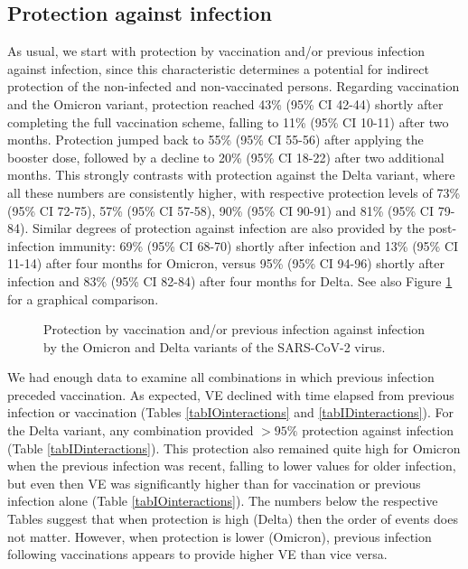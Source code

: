 \documentclass[preprint,12pt,authoryear]{elsarticle}
\begin{document}
\subsection*{Protection against infection}

As usual, we start with protection by vaccination and/or previous infection against infection, since this characteristic determines a potential for indirect protection of the non-infected and non-vaccinated persons. Regarding vaccination and the Omicron variant, protection reached 43\% (95\% CI 42-44) shortly after completing the full vaccination scheme, falling to 11\% (95\% CI 10-11) after two months. Protection jumped back to 55\% (95\% CI 55-56) after applying the booster dose, followed by a decline to 20\% (95\% CI 18-22) after two additional months. This strongly contrasts with protection against the Delta variant, where all these numbers are consistently higher, with respective protection levels of 73\% (95\% CI 72-75), 57\% (95\% CI 57-58), 90\% (95\% CI 90-91) and 81\% (95\% CI 79-84). Similar degrees of protection against infection are also provided by the post-infection immunity: 69\% (95\% CI 68-70) shortly after infection and 13\% (95\% CI 11-14) after four months for Omicron, versus 95\% (95\% CI 94-96) shortly after infection and 83\% (95\% CI 82-84) after four months for Delta. See also Figure \ref{figIalone} for a graphical comparison.

\begin{figure}[h]
\centering
\caption{Protection by vaccination and/or previous infection against infection by the Omicron and Delta variants of the SARS-CoV-2 virus.}
\label{figIalone}
\end{figure}

We had enough data to examine all combinations in which previous infection preceded vaccination. As expected, VE declined with time elapsed from previous infection or vaccination (Tables \ref{tabIOinteractions} and \ref{tabIDinteractions}). For the Delta variant, any combination provided $>95\%$ protection against infection (Table \ref{tabIDinteractions}). This protection also remained quite high for Omicron when the previous infection was recent, falling to lower values for older infection, but even then VE was significantly higher than for vaccination or previous infection alone (Table \ref{tabIOinteractions}). The numbers below the respective Tables suggest that when protection is high (Delta) then the order of events does not matter. However, when protection is lower (Omicron), previous infection following vaccinations appears to provide higher VE than vice versa. 
\end{document}
